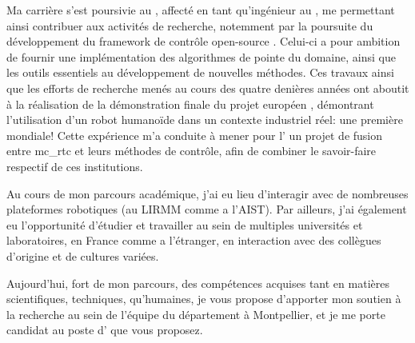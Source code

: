\documentclass[11pt, a4paper]{awesome-cv}
\begin{document}
\begin{cvletter}
Ma carrière s'est poursivie au , affecté en tant qu'ingénieur au , me permettant ainsi contribuer aux activités de recherche, notemment par la poursuite du développement du framework de contrôle open-source . Celui-ci a pour ambition de fournir une implémentation des algorithmes de pointe du domaine, ainsi que les outils essentiels au développement de nouvelles méthodes. Ces travaux ainsi que les efforts de recherche menés au cours des quatre denières années ont aboutit à la réalisation de la démonstration finale du projet européen , démontrant l'utilisation d'un robot humanoïde dans un contexte industriel réel: une première mondiale! Cette expérience m'a conduite à mener pour l' un projet de fusion entre mc\_rtc et leurs méthodes de contrôle, afin de combiner le savoir-faire respectif de ces institutions. 

Au cours de mon parcours académique, j'ai eu lieu d'interagir avec de nombreuses plateformes robotiques (au LIRMM comme a l'AIST). Par ailleurs, j'ai également eu l'opportunité d'étudier et travailler au sein de multiples universités et laboratoires, en France comme a l'étranger, en interaction avec des collègues d'origine et de cultures variées.

  Aujourd'hui, fort de mon parcours, des compétences acquises tant en matières scientifiques, techniques, qu'humaines, je vous propose d'apporter mon soutien à la recherche au sein de l’équipe du département  à Montpellier, et je me porte candidat au poste d' que vous proposez.

\end{cvletter}


\makeletterclosing
\end{document}
